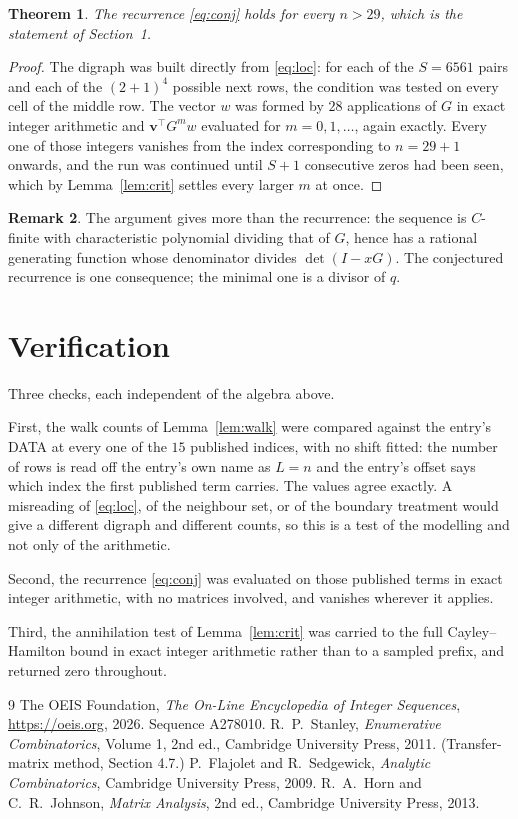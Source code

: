 \documentclass[11pt,a4paper]{article}
\theoremstyle{plain}
\newtheorem{theorem}{Theorem}
\theoremstyle{definition}
\newtheorem{remark}[theorem]{Remark}
\begin{document}
\begin{theorem}
The recurrence \eqref{eq:conj} holds for every $n>29$, which is the statement of
Section~1.
\end{theorem}

\begin{proof}
The digraph was built directly from \eqref{eq:loc}: for each of the $S=6561$ pairs and each
of the $(2+1)^{4}$ possible next rows, the condition was tested on every cell of
the middle row. The vector $w$ was formed by $28$ applications of $G$ in exact integer
arithmetic and $\mathbf{v}^{\!\top}G^{m}w$ evaluated for $m=0,1,\dots$, again exactly.
Every one of those integers vanishes from the index corresponding to $n=29+1$ onwards,
and the run was continued until $S+1$ consecutive zeros had been seen, which by
Lemma~\ref{lem:crit} settles every larger $m$ at once.
\end{proof}

\begin{remark}
The argument gives more than the recurrence: the sequence is $C$-finite with characteristic
polynomial dividing that of $G$, hence has a rational generating function whose denominator
divides $\det(I-xG)$. The conjectured recurrence is one consequence; the minimal one is a
divisor of $q$.
\end{remark}

\section{Verification}

Three checks, each independent of the algebra above.

First, the walk counts of Lemma~\ref{lem:walk} were compared against the entry's DATA at
every one of the $15$ published indices, with no shift fitted: the number of rows is
read off the entry's own name as $L=n$ and the entry's offset says which index the first
published term carries. The values agree exactly. A misreading of \eqref{eq:loc}, of the
neighbour set, or of the boundary treatment would give a different digraph and different
counts, so this is a test of the modelling and not only of the arithmetic.

Second, the recurrence \eqref{eq:conj} was evaluated on those published terms in exact
integer arithmetic, with no matrices involved, and vanishes wherever it applies.

Third, the annihilation test of Lemma~\ref{lem:crit} was carried to the full
Cayley--Hamilton bound in exact integer arithmetic rather than to a sampled prefix, and
returned zero throughout.

\begin{thebibliography}{9}
 The OEIS Foundation, \emph{The On-Line Encyclopedia of Integer
Sequences}, \url{https://oeis.org}, 2026. Sequence A278010.
 R.~P.~Stanley, \emph{Enumerative Combinatorics}, Volume 1, 2nd ed.,
Cambridge University Press, 2011. (Transfer-matrix method, Section 4.7.)
 P.~Flajolet and R.~Sedgewick, \emph{Analytic Combinatorics}, Cambridge
University Press, 2009.
 R.~A.~Horn and C.~R.~Johnson, \emph{Matrix Analysis}, 2nd ed., Cambridge
University Press, 2013.
\end{thebibliography}
\end{document}
